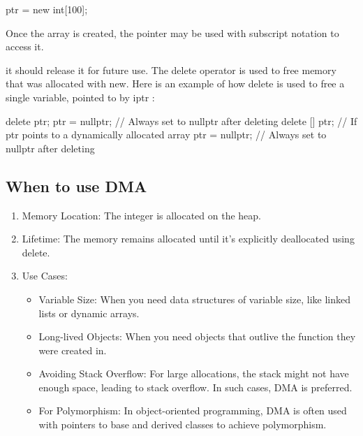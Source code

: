 \documentclass{report}
\begin{document}
\begin{cppcode}
ptr = new int[100];
\end{cppcode}

\bigbreak \noindent 
    Once the array is created, the pointer may be used with subscript notation to access it. 

    \bigbreak \noindent 
     it should
release it for future use. The delete operator is used to free memory that was allocated
with new. Here is an example of how delete is used to free a single variable, pointed to
by iptr :
    \bigbreak \noindent 
    
    \begin{cppcode}
delete ptr;
ptr = nullptr; // Always set to nullptr after deleting
delete [] ptr; // If ptr points to a dynamically allocated array
ptr = nullptr; // Always set to nullptr after deleting
    \end{cppcode}
    
    \bigbreak \noindent 
    \bigbreak \noindent 

    \bigbreak \noindent 
    \subsection{When to use DMA}
    \bigbreak \noindent 
    \begin{enumerate}
        \item Memory Location: The integer is allocated on the heap.
        \item Lifetime: The memory remains allocated until it's explicitly deallocated using delete.
        \item Use Cases:
        \begin{itemize}
            \item Variable Size: When you need data structures of variable size, like linked lists or dynamic arrays.
            \item Long-lived Objects: When you need objects that outlive the function they were created in.
            \item Avoiding Stack Overflow: For large allocations, the stack might not have enough space, leading to stack overflow. In such cases, DMA is preferred.
            \item For Polymorphism: In object-oriented programming, DMA is often used with pointers to base and derived classes to achieve polymorphism.
        \end{itemize}
    \end{enumerate}
\end{document}
